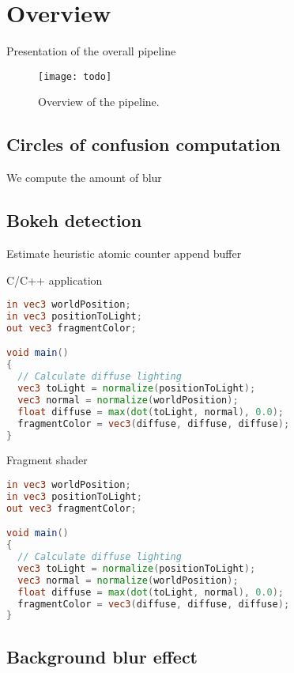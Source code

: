 \section{Overview}
Presentation of the overall pipeline

	\begin{figure}[htb]\centering
	\texttt{[image: todo]}
	\caption{Overview of the pipeline.}
	\label{YourName:fig1}
	\end{figure}

\subsection{Circles of confusion computation}
We compute the amount of blur 

\subsection{Bokeh detection}
Estimate
heuristic
atomic counter
append buffer

C/C++ application
\begin{lstlisting}[language=GLSL,float={htb},caption={Your caption.},label={YourName:listing1}]
in vec3 worldPosition;
in vec3 positionToLight;
out vec3 fragmentColor;

void main()
{
  // Calculate diffuse lighting
  vec3 toLight = normalize(positionToLight);
  vec3 normal = normalize(worldPosition);
  float diffuse = max(dot(toLight, normal), 0.0);
  fragmentColor = vec3(diffuse, diffuse, diffuse);
}
\end{lstlisting}

Fragment shader
\begin{lstlisting}[language=GLSL,float={htb},caption={Your caption.},label={YourName:listing1}]
in vec3 worldPosition;
in vec3 positionToLight;
out vec3 fragmentColor;

void main()
{
  // Calculate diffuse lighting
  vec3 toLight = normalize(positionToLight);
  vec3 normal = normalize(worldPosition);
  float diffuse = max(dot(toLight, normal), 0.0);
  fragmentColor = vec3(diffuse, diffuse, diffuse);
}
\end{lstlisting}


\subsection{Background blur effect}

